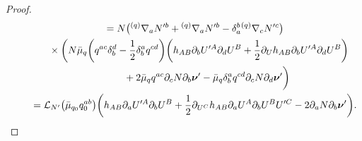 \documentclass[pdftex]{sigma}
\def\ptl{\partial}%
\def\mbo#1{\boldsymbol{#1}}%
\def\grad{{\nabla}}%
\newcommand{\leftexp}[2]{{\vphantom{#2}}^{#1}{#2}}
\def\halb{\frac{1}{2}}%
\numberwithin{equation}{section}
\begin{document}
\begin{proof}
\begin{gather*}
 \qquad{} = N \bigl(\leftexp{(q)}{\grad}_a N'^b + \leftexp{(q)}{\grad}_a N'^b - \delta^b_a \leftexp{(q)}{\grad}_c N'^c\bigr) \\
\qquad\quad{}\times\biggl( N \bar{\mu}_q \biggl(q^{ac} \delta^d_b - \halb \delta^a_b q^{cd}\biggr) \biggl(h_{AB} \ptl_b U'^A \ptl_d U^B + \halb \ptl_{U}h_{AB} \ptl_b U'^A \ptl_d U^B \biggr) \\
\qquad\quad\hphantom{\times\biggl(\,}{} + 2 \bar{\mu}_q q^{ac}\ptl_c N \ptl_b \mbo{\nu}'
 - \bar{\mu}_q \delta^a_b q^{cd} \ptl_c N \ptl_d \mbo{\nu}'\biggr) \\
\qquad{} = \mathcal{L}_{N'} \bigl(\bar{\mu}_{q_0} q^{ab}_0\bigr) \biggl(h_{AB} \ptl_a U'^A \ptl_b U^B + \halb \ptl_{U^C} h_{AB} \ptl_a U^A \ptl_b U^B U'^C -2 \ptl_a N \ptl_b \mbo{\nu}'\biggr).
\end{gather*}


\end{proof}
\end{document}
